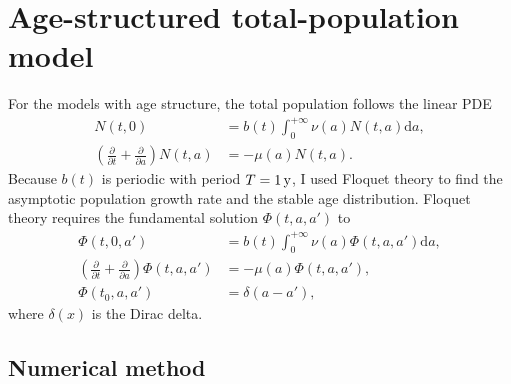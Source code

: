 \documentclass[USenglish]{article}
\newcommand{\md}{\mathrm{d}}
\begin{document}
\appendix


\section{Age-structured total-population model}
\label{appendix_Floquet_theory}

For the models with age structure, the total population follows the
linear PDE
\begin{subequations}
  \begin{align}
    N(t, 0)
    &= b(t) \int_0^{+\infty} \nu(a) N(t, a) \md a,
    \\
    \left(\frac{\partial}{\partial t}
      + \frac{\partial}{\partial a}\right)
    N(t, a)
    &= - \mu(a) N(t, a).
  \end{align}
\end{subequations}
Because $b(t)$ is periodic with period $T = \unit[1]{y}$, I used
Floquet theory \autocite{parker_1992} to find the asymptotic
population growth rate and the stable age distribution. Floquet theory
requires the fundamental solution $\Phi(t, a, a')$ to
\begin{subequations}
  \begin{align}
    \Phi(t, 0, a')
    &= b(t) \int_0^{+\infty} \nu(a) \Phi(t, a, a') \md a,
    \\
    \left(\frac{\partial}{\partial t}
      + \frac{\partial}{\partial a}\right)
    \Phi(t, a, a')
    &= - \mu(a) \Phi(t, a, a'),
    \\
    \Phi(t_0, a, a')
    &= \delta(a - a'),
  \end{align}
\end{subequations}
where $\delta(x)$ is the Dirac delta.


\subsection{Numerical method}
\end{document}
